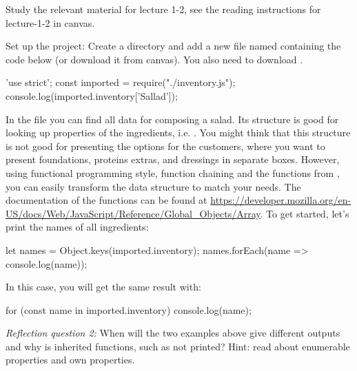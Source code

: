 \documentclass[fleqn, article, a4paper]{memoir}
\begin{document}
\begin{Assignments}

\item Study the relevant material for lecture 1-2, see the reading instructions for lecture-1-2 in canvas. 


\item %
Set up the project: Create a directory and add a new file named  containing the code below (or download it from canvas). You also need to download .
\begin{Code}
'use strict';
const imported = require("./inventory.js");
console.log(imported.inventory['Sallad']);
\end{Code}



\item In the  file you can find all data for composing a salad. Its structure is good for looking up properties of the ingredients, i.e. . You might think that this structure is not good for presenting the options for the customers, where you want to present foundations, proteins extras, and dressings in separate boxes. However, using functional programming style, function chaining and the functions from , you can easily transform the data structure to match your needs. The documentation of the functions can be found at \url{https://developer.mozilla.org/en-US/docs/Web/JavaScript/Reference/Global_Objects/Array}. To get started, let's print the names of all ingredients:
\begin{Code}
let names = Object.keys(imported.inventory);
names.forEach(name => console.log(name));
\end{Code}
In this case, you will get the same result with:
\begin{Code}
for (const name in imported.inventory) {
  console.log(name);
}
\end{Code}
\emph{Reflection question 2:} When will the two examples above give different outputs and why is inherited functions, such as  not printed? Hint: read about enumerable properties and own properties.


\end{Assignments}
\end{document}
